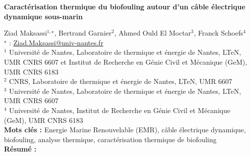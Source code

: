 


    \newpage


%
\begin{flushleft}
\addtocounter{section}{1}
{\Large \textbf{Caractérisation thermique du biofouling autour d'un câble électrique dynamique sous-marin}}\label{ref:38}
\end{flushleft}
%
Ziad Maksassi$^{1,\star}$, Bertrand Garnier$^{2}$, Ahmed Ould El Moctar$^{3}$, Franck Schoefs$^{4}$\\[2mm]
$^{\star}$ \Letter : \url{Ziad.Maksassi@univ-nantes.fr}\\[2mm]
{\footnotesize $^{1}$ Université de Nantes, Laboratoire de thermique et énergie de Nantes, LTeN, UMR CNRS 6607 et Institut de Recherche en Génie Civil et Mécanique (GeM), UMR CNRS 6183}\\
{\footnotesize $^{2}$ CNRS, Laboratoire de thermique et énergie de Nantes, LTeN, UMR 6607}\\
{\footnotesize $^{3}$ Université de Nantes, Laboratoire de thermique et énergie de Nantes, LTeN, UMR CNRS 6607}\\
{\footnotesize $^{4}$ Université de Nantes, Institut de Recherche en Génie Civil et Mécanique (GeM), UMR CNRS 6183}\\
[4mm]
%
\noindent \textbf{Mots clés : } Energie Marine Renouvelable (EMR), câble électrique dynamique, biofouling, analyse thermique, caractérisation thermique de biofouling\\[4mm]
%
\noindent \textbf{Résumé : } 

